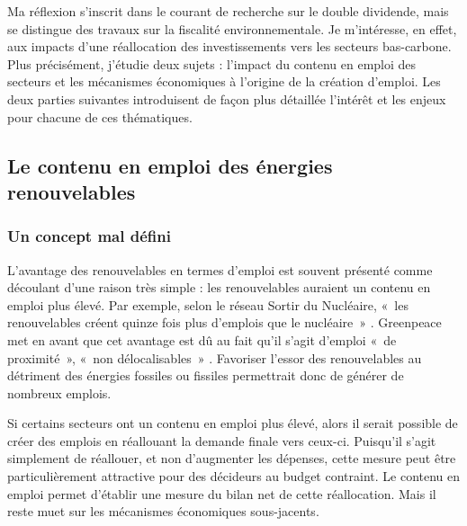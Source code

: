 Ma réflexion s'inscrit dans le courant de recherche sur le double dividende, mais se distingue des travaux sur la fiscalité environnementale. Je m'intéresse, en effet, aux impacts d'une réallocation des investissements vers les secteurs bas-carbone. Plus précisément, j'étudie deux sujets : l'impact du contenu en emploi des secteurs et les mécanismes économiques à l'origine de la création d'emploi. Les deux parties suivantes introduisent de façon plus détaillée l'intérêt et les enjeux pour chacune de ces thématiques.


\subsection{Le contenu en emploi des énergies renouvelables}

\subsubsection{Un concept mal défini}
L’avantage des renouvelables en termes d’emploi est souvent présenté comme découlant d'une raison très simple : les renouvelables auraient un contenu en emploi plus élevé. Par exemple, selon le réseau Sortir du Nucléaire, «~les renouvelables créent quinze fois plus d’emplois que le nucléaire~» \citep{Les7ventsduCotentin2009}. Greenpeace met en avant que cet avantage est dû au fait qu’il s’agit d’emploi «~de proximité~», «~non délocalisables~» \citep{Greenpeace2011}. Favoriser l’essor des renouvelables au détriment des énergies fossiles ou fissiles permettrait donc de générer de nombreux emplois.

Si certains secteurs ont un contenu en emploi plus élevé, alors il serait possible de créer des emplois en réallouant la demande finale vers ceux-ci. Puisqu’il s’agit simplement de réallouer, et non d’augmenter les dépenses, cette mesure peut être particulièrement attractive pour des décideurs au budget contraint. Le contenu en emploi permet d'établir une mesure du bilan net de cette réallocation. Mais il reste muet sur les mécanismes économiques sous-jacents. 


